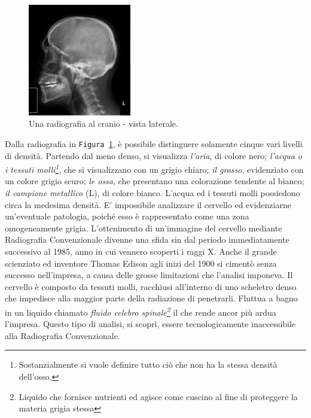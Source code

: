 \documentclass[a4paper,12pt, doubleside]{report}
\begin{document}
                    \begin{figure}[h]
                        \centering
                        \includegraphics[width=0.4\textwidth]{radiografia}
                        \caption{Una radiografia al cranio - vista laterale.}
                        \label{fig:skull}
                    \end{figure}
                        
                    \bigskip
                    Dalla radiografia in \texttt{Figura \ref{fig:skull}}, è possibile distinguere solamente cinque vari livelli di densità. Partendo dal meno denso, si visualizza \textit{l'aria}, di colore nero; \textit{l'acqua o i tessuti molli\footnote{Sostanzialmente si vuole definire tutto ciò che non ha la stessa densità dell'osso.}}, che si visualizzano con un grigio chiaro; \textit{il grasso}, evidenziato con un colore grigio scuro; \textit{le ossa}, che presentano una colorazione tendente al bianco; \textit{il campione metallico} (L), di colore bianco. L’acqua ed i tessuti molli possiedono circa la medesima densità. E' impossibile analizzare il cervello ed evidenziarne un'eventuale patologia, poiché esso è rappresentato come una zona omogeneamente grigia. L'ottenimento di un'immagine del cervello mediante Radiografia Convenzionale divenne una sfida sin dal periodo immediatamente successivo al 1985, anno in cui vennero scoperti i raggi X. Anche il grande scienziato ed inventore Thomas Edison agli inizi del 1900 si cimentò senza successo nell'impresa, a causa delle grosse limitazioni che l'analisi imponeva.\cite{thomas-edison-brain} Il cervello è composto da tessuti molli, racchiusi all’interno di uno scheletro denso che impedisce alla maggior parte della radiazione di penetrarli. Fluttua a bagno in un liquido chiamato \textit{fluido celebro spinale\footnote{Liquido che fornisce nutrienti ed agisce come cuscino al fine di proteggere la materia grigia stessa}} il che rende ancor più ardua l'impresa. Questo tipo di analisi, si scoprì, essere tecnologicamente inaccessibile alla Radiografia Convenzionale.
                
\end{document}
